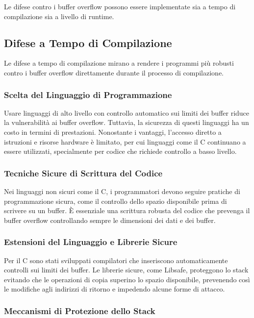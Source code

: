 Le difese contro i buffer overflow possono essere implementate sia a tempo di compilazione sia a livello di runtime.

\subsection{Difese a Tempo di Compilazione}

Le difese a tempo di compilazione mirano a rendere i programmi più robusti contro i buffer overflow direttamente durante il processo di compilazione.

\subsubsection{Scelta del Linguaggio di Programmazione}

Usare linguaggi di alto livello con controllo automatico sui limiti dei buffer riduce la vulnerabilità ai buffer overflow. Tuttavia, la sicurezza di questi linguaggi ha un costo in termini di prestazioni. Nonostante i vantaggi, l'accesso diretto a istruzioni e risorse hardware è limitato, per cui linguaggi come il C continuano a essere utilizzati, specialmente per codice che richiede controllo a basso livello.

\subsubsection{Tecniche Sicure di Scrittura del Codice}

Nei linguaggi non sicuri come il C, i programmatori devono seguire pratiche di programmazione sicura, come il controllo dello spazio disponibile prima di scrivere su un buffer. È essenziale una scrittura robusta del codice che prevenga il buffer overflow controllando sempre le dimensioni dei dati e dei buffer.

\subsubsection{Estensioni del Linguaggio e Librerie Sicure}

Per il C sono stati sviluppati compilatori che inseriscono automaticamente controlli sui limiti dei buffer. Le librerie sicure, come Libsafe, proteggono lo stack evitando che le operazioni di copia superino lo spazio disponibile, prevenendo così le modifiche agli indirizzi di ritorno e impedendo alcune forme di attacco.

\subsubsection{Meccanismi di Protezione dello Stack}

